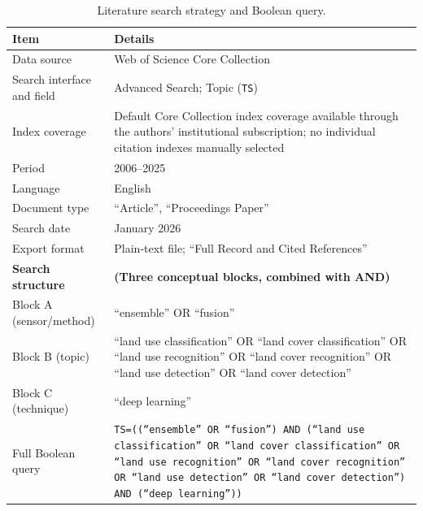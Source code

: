 \documentclass[]{interact}
\theoremstyle{plain}%
\theoremstyle{definition}
\theoremstyle{remark}
\DeclareRobustCommand{\DIFadd}[1]{{\protect\color{DIFaddcolor}\uwave{#1}}}
\DeclareRobustCommand{\DIFdel}[1]{{\protect\color{DIFdelcolor}\sout{#1}}}
\def\DIFadd#1{#1}%
\def\DIFdel#1{}%
\begin{document}
\begin{table}[htb!]
	\centering
	\setlength{\belowcaptionskip}{5pt}
		\caption{\DIFdel{Detailed} \DIFdel{classification} \DIFdel{and} \DIFdel{statistics} \DIFdel{of} \DIFdel{the} \DIFdel{literature}\hspace{0.33em}\DIFadd{Literature} search strategy \DIFadd{and} \DIFadd{Boolean} \DIFadd{query}.}
		\label{tab:search_strategy}
		\small 
		\setlength{\tabcolsep}{3pt}
		\renewcommand{\arraystretch}{1.4}
		\begin{tabular}{@{} p{4.1cm} p{9.7cm} @{}} 
		\toprule
		\textbf{Item} & \textbf{Details} \\
		\midrule
		Data source & Web of Science Core Collection \\
		\DIFadd{Search} \DIFadd{interface} \DIFadd{and} \DIFadd{field} & \DIFadd{Advanced} \DIFadd{Search}\DIFadd{;} \DIFadd{Topic} \DIFadd{(}\texttt{\DIFadd{TS}}\DIFadd{)} \\
		\DIFadd{Index} \DIFadd{coverage} & \DIFadd{Default} \DIFadd{Core} \DIFadd{Collection} \DIFadd{index} \DIFadd{coverage} \DIFadd{available} \DIFadd{through} \DIFadd{the} \DIFadd{authors'} \DIFadd{institutional} \DIFadd{subscription}\DIFadd{;} \DIFadd{no} \DIFadd{individual} \DIFadd{citation} \DIFadd{indexes} \DIFadd{manually} \DIFadd{selected} \\
		Period & 2006--2025 \\
		Language & English \\
		Document type & ``Article'', ``\DIFdel{Proceeding}\hspace{0.33em}\DIFadd{Proceedings} Paper'' \\
		Search date & \DIFdel{December} \DIFdel{2025} \DIFadd{January} \DIFadd{2026} \\
		\DIFadd{Export} \DIFadd{format} & \DIFadd{Plain-text} \DIFadd{file}\DIFadd{;} \DIFadd{`}\DIFadd{`}\DIFadd{Full} \DIFadd{Record} \DIFadd{and} \DIFadd{Cited} \DIFadd{References''} \\
		\midrule
		\textbf{Search structure} & \textbf{(Three conceptual blocks, combined with AND)} \\
		Block A (sensor/method) & ``ensemble'' OR ``fusion'' \\
		Block B (topic) & ``land use classification'' OR ``land cover classification'' OR ``land use recognition'' OR ``land cover recognition'' OR ``land use detection'' OR ``land cover detection'' \\
		Block C (technique) & ``deep learning'' \\
		\midrule
			Full Boolean query & \parbox{9.7cm}{\texttt{TS=((``ensemble'' OR ``fusion'') AND (``land use classification'' OR ``land cover classification'' OR ``land use recognition'' OR ``land cover recognition'' OR ``land use detection'' OR ``land cover detection'') AND (``deep learning''))}} \\
		\bottomrule
	\end{tabular}
\end{table}
\end{document}
